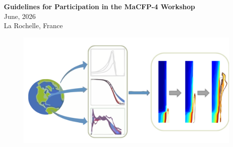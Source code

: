 \documentclass[12pt]{article}
\begin{document}

\thispagestyle{empty}

\begin{center}
{\bf\Large Guidelines for Participation in the MaCFP-4 Workshop} \\
{\large June, 2026\\La Rochelle, France}
\end{center}

\begin{figure}[h]
  \centering
  \includegraphics[width=6in]{../MaCFP_Logo.pdf}
  \label{Cover_Image}
\end{figure}

\vfill
\end{document}
